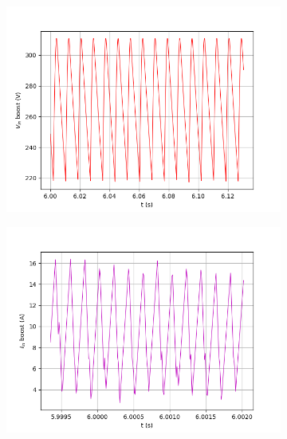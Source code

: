 \begin{figure}[!hbt]
	\centering
	\begin{subfigure}[b]{0.49\textwidth}
	\centering
		\includegraphics[width=\textwidth]{figuras/sim_figures/inversor_e_boost/tensao_entrada_boost_2.png}
		\caption{}
	\end{subfigure}
	\begin{subfigure}[b]{0.49\textwidth}
	\centering
		\includegraphics[width=\textwidth]{figuras/sim_figures/inversor_e_boost/corrente_entrada_boost.png}
		\caption{}
	\end{subfigure}
	\begin{subfigure}[b]{0.49\textwidth}
	\centering

\end{subfigure}
\end{figure}
